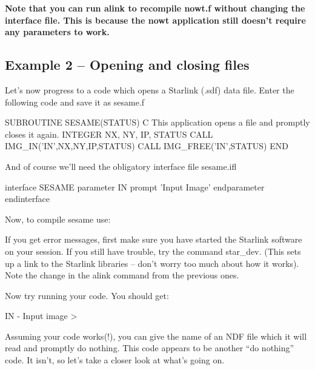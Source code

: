 \documentclass[11pt,nolof]{starlink}
\begin{document}
      \textbf{Note that you can run \textsf{alink} to
      recompile \textsf{nowt.f} without changing the interface file. This is
      because the \textsf{nowt} application still doesn't require any
      parameters to work.}

\subsection{Example 2 -- Opening and closing files}

Let's now progress to a code which opens a Starlink (.sdf)
data file. Enter the following
code and save it as \textsf{sesame.f}

\begin{small}
\begin{terminalv}
       SUBROUTINE SESAME(STATUS)
C This application opens a file and promptly closes it again.
       INTEGER NX, NY, IP, STATUS
       CALL IMG_IN('IN',NX,NY,IP,STATUS)
       CALL IMG_FREE('IN',STATUS)
       END
\end{terminalv}
\end{small}

And of course we'll need the obligatory interface file \textsf{sesame.ifl}

\begin{small}
\begin{terminalv}
interface SESAME
  parameter IN
    prompt 'Input Image'
  endparameter
endinterface
\end{terminalv}
\end{small}

Now, to compile sesame use:

\begin{terminalv}
\end{terminalv}

If you get error messages, first make sure you have started the Starlink
software on your session.  If you still have trouble, try the command \textsf{star\_dev}. (This sets up a link to the Starlink libraries -- don't worry too
much about how it works). Note the change in the \textsf{alink} command from the
previous ones.

Now try running your code. You should get:

\begin{terminalv}
IN - Input image >
\end{terminalv}

Assuming your code works(!), you can give the name of an NDF file which it
will read and promptly do nothing. This code appears to be another ``do
nothing'' code. It isn't, so let's take a closer look at what's going on.
\end{document}
